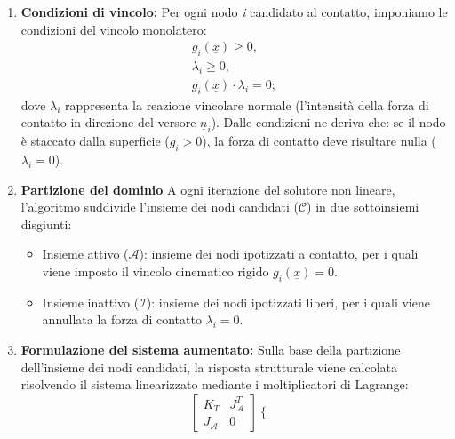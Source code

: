 \begin{enumerate}
\begin{enumerate}[label=\alph*)]
\begin{equation}
    \end{equation}
  \end{enumerate}
  L'insieme $\mathcal{C}$ costituisce il dominio di ricerca su cui l'algoritmo \textit{Active set} andrà a definire e aggiornare gli insiemi dei nodi attivi $\left( \mathcal{A} \subset \mathcal{C} \right)$ e inattivi $\left( \mathcal{I} = \mathcal{C} \backslash \mathcal{A} \right)$.
  \item \textbf{Condizioni di vincolo:}
  Per ogni nodo \textit{i} candidato al contatto, imponiamo le condizioni del vincolo monolatero:
  \begin{equation}
    \begin{aligned}
      g_i(\underline{x}) \geq 0, \\
      \lambda_i \geq 0, \\
      g_i(\underline{x}) \cdot \lambda_i = 0;
    \end{aligned}
  \end{equation}
  dove $\lambda_i$ rappresenta la reazione vincolare normale (l'intensità della forza di contatto in direzione del versore $\underline{n}_i$). Dalle condizioni ne deriva che: se il nodo è staccato dalla superficie ($g_i>0$), la forza di contatto deve risultare nulla ($\lambda_i = 0$). 
  \item \textbf{Partizione del dominio}
  A ogni iterazione del solutore non lineare, l'algoritmo suddivide l'insieme dei nodi candidati ($\mathcal{C}$) in due sottoinsiemi disgiunti:
  \begin{itemize}
    \item Insieme attivo ($\mathcal{A}$): insieme dei nodi ipotizzati a contatto, per i quali viene imposto il vincolo cinematico rigido $g_i(\underline{x}) = 0$. 
    \item Insieme inattivo ($\mathcal{I}$): insieme dei nodi ipotizzati liberi, per i quali viene annullata la forza di contatto $\lambda_i = 0$.
  \end{itemize}
  \item \textbf{Formulazione del sistema aumentato:}
  Sulla base della partizione dell'insieme dei nodi candidati, la risposta strutturale viene calcolata risolvendo il sistema linearizzato mediante i moltiplicatori di Lagrange: 
  \begin{equation}
    \left[\begin{matrix}
     K_{T} & J_{\mathcal{A}}^T \\
     J_{\mathcal{A}} & 0 
    \end{matrix}\right] 
    \left\{\begin{array}{c}

\end{array}
\end{equation}
\end{enumerate}
